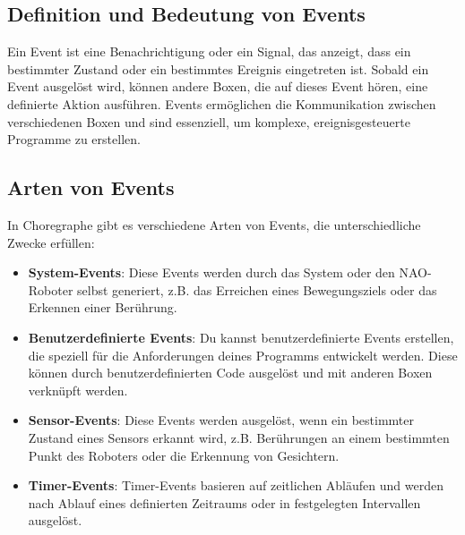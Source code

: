 \subsection{Definition und Bedeutung von Events}
Ein Event ist eine Benachrichtigung oder ein Signal, das anzeigt, dass ein bestimmter Zustand oder ein bestimmtes Ereignis eingetreten ist. Sobald ein Event ausgelöst wird, können andere Boxen, die auf dieses Event hören, eine definierte Aktion ausführen. Events ermöglichen die Kommunikation zwischen verschiedenen Boxen und sind essenziell, um komplexe, ereignisgesteuerte Programme zu erstellen.

\subsection{Arten von Events}
In Choregraphe gibt es verschiedene Arten von Events, die unterschiedliche Zwecke erfüllen:
\begin{itemize}
    \item \textbf{System-Events}: Diese Events werden durch das System oder den NAO-Roboter selbst generiert, z.B. das Erreichen eines Bewegungsziels oder das Erkennen einer Berührung.
    \item \textbf{Benutzerdefinierte Events}: Du kannst benutzerdefinierte Events erstellen, die speziell für die Anforderungen deines Programms entwickelt werden. Diese können durch benutzerdefinierten Code ausgelöst und mit anderen Boxen verknüpft werden.
    \item \textbf{Sensor-Events}: Diese Events werden ausgelöst, wenn ein bestimmter Zustand eines Sensors erkannt wird, z.B. Berührungen an einem bestimmten Punkt des Roboters oder die Erkennung von Gesichtern.
    \item \textbf{Timer-Events}: Timer-Events basieren auf zeitlichen Abläufen und werden nach Ablauf eines definierten Zeitraums oder in festgelegten Intervallen ausgelöst.
\end{itemize}

